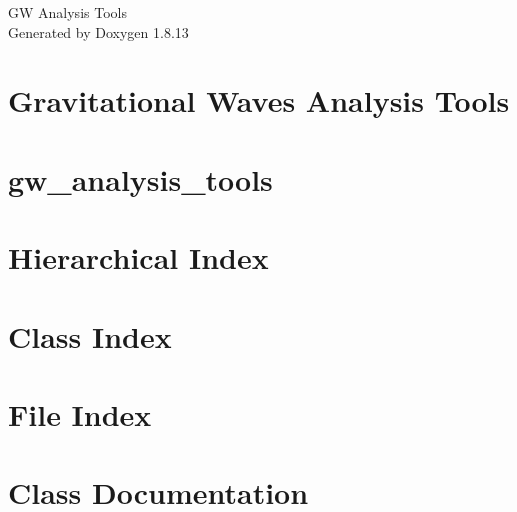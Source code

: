 \documentclass[twoside]{book}
\newcommand{\+}{\discretionary{\mbox{\scriptsize$\hookleftarrow$}}{}{}}
\newcommand{\clearemptydoublepage}{%
  \newpage{\pagestyle{empty}\cleardoublepage}%
}
\begin{document}
\hypersetup{pageanchor=false,
             bookmarksnumbered=true,
             pdfencoding=unicode
            }
\begin{titlepage}
\vspace*{7cm}
\begin{center}%
{\Large GW Analysis Tools }\\
\vspace*{1cm}
{\large Generated by Doxygen 1.8.13}\\
\end{center}
\end{titlepage}
\clearemptydoublepage
{}
\tableofcontents
\clearemptydoublepage
{}
\hypersetup{pageanchor=true}

\chapter{Gravitational Waves Analysis Tools}
\label{index}\hypertarget{index}{}
\chapter{gw\+\_\+analysis\+\_\+tools}
\label{md_README}

\chapter{Hierarchical Index}

\chapter{Class Index}

\chapter{File Index}

\chapter{Class Documentation}



































\end{document}
